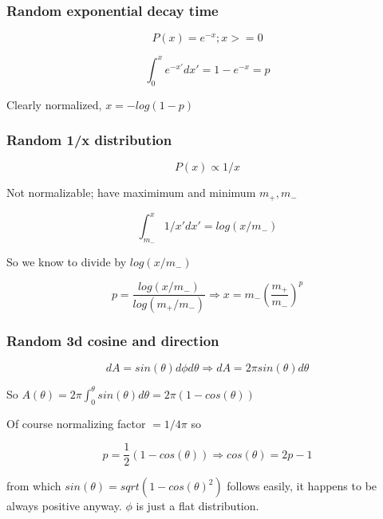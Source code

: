 \documentclass[12pt]{article}
\begin{document}

\subsubsection*{Random exponential decay time}
$$P(x)= e^{-x} ; x>=0$$

$$\int_0^x e^{-x'} dx' = 1 - e^{-x} = p $$

Clearly normalized, $x = -log(1-p)$

\subsubsection*{Random 1/x distribution}
$$P(x)\propto 1/x$$

Not normalizable; have maximimum and minimum $m_+,m_-$

$$\int_{m_-}^x1/x' dx' = log(x/m_-)$$

So we know to divide by $log(x/m_-)$

$$p = \frac{log(x/m_-)}{log(m_+/m_-)}  \Rightarrow
  x = m_-\left(\frac{m_+}{m_-}\right)^p$$

\subsubsection*{Random 3d cosine and direction}
$$dA = sin(\theta)d\phi d\theta \Rightarrow dA = 2\pi sin(\theta)d\theta$$

So $A(\theta) = 2\pi \int_0^\theta sin(\theta)d\theta = 2\pi(1-cos(\theta))$

Of course normalizing factor $=1/4\pi$ so

$$ p = \frac{1}{2}(1-cos(\theta)) \Rightarrow cos(\theta) = 2p-1 $$

from which $sin(\theta)=sqrt(1-cos(\theta)^2)$ follows easily, it happens to be
always positive anyway. $\phi$ is just a flat distribution.
\end{document}
